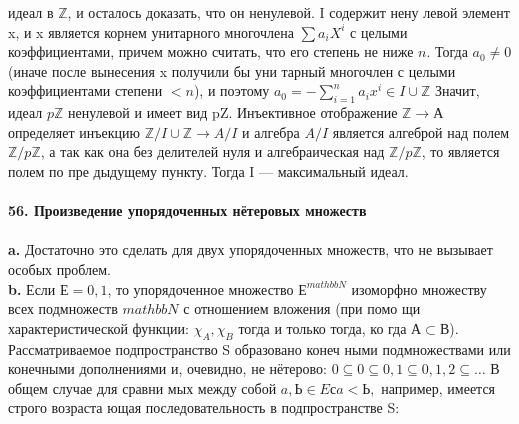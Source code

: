 идеал в $\mathbb{Z}$, и осталось доказать, что он ненулевой. I содержит нену­\linebreak
левой элемент x, и x является корнем унитарного многочлена $\sum a_{i}X^{i}$\linebreak
с целыми коэффициентами, причем можно считать, что его степень\linebreak
не ниже $n$. Тогда $a_0 \neq 0$ (иначе после вынесения x получили бы уни­\linebreak
тарный многочлен с целыми коэффициентами степени $< n$), и поэтому\linebreak
$a_0 = - \sum^{n}_{i = 1}a_{i}x^{i} \in I \cup \mathbb{Z}$ Значит, идеал $p\mathbb{Z}$ ненулевой и имеет вид pZ.\linebreak
Инъективное отображение $\mathbb{Z} \rightarrow А$ определяет инъекцию $\mathbb{Z}/I\cup\mathbb{Z} \rightarrow A/I$\linebreak
и алгебра $A/I$ является алгеброй над полем $\mathbb{Z}/p\mathbb{Z}$, а так как она без\linebreak
делителей нуля и алгебраическая над $\mathbb{Z}/p\mathbb{Z}$, то является полем по пре­\linebreak
дыдущему пункту. Тогда I --- максимальный идеал.\\
\\
\noindent\textbf{56. Произведение упорядоченных нётеровых множеств}\\
\\
\hspace*{15pt}\textbf{a.} Достаточно это сделать для двух упорядоченных множеств, что\linebreak
не вызывает особых проблем.\\
\hspace*{15pt}\textbf{b.} Если $Е = {0,1}$, то упорядоченное множество $Е^{mathbb{N}}$ изоморфно\linebreak
множеству всех подмножеств $mathbb{N}$ с отношением вложения (при помо­\linebreak
щи характеристической функции: $\chi_A, \chi_B$ тогда и только тогда, ко­\linebreak
гда $А \subset В$). Рассматриваемое подпространство S образовано конеч­\linebreak
ными подмножествами или конечными дополнениями и, очевидно, не\linebreak
нётерово: $0 \subseteq {0} \subseteq {0,1} \subseteq {0,1,2} \subseteq\ldots$ В общем случае для сравни­\linebreak
мых между собой $a, Ь \in E с a < Ь,$ например, имеется строго возраста­\linebreak
ющая последовательность в подпространстве S:

